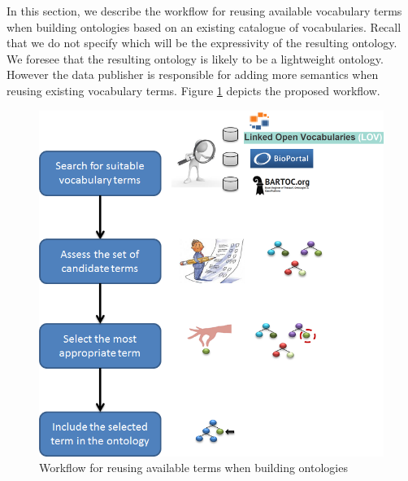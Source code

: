 
In this section, we describe the workflow for reusing available vocabulary terms when building ontologies based on an existing catalogue of vocabularies. Recall that we do not specify which will be the expressivity of the resulting ontology. We foresee that the resulting ontology is likely to be a lightweight ontology. However the data publisher is responsible for adding more semantics when reusing existing vocabulary terms. Figure \ref{fig:workflow} depicts the proposed workflow. 

\begin{figure}
\centering
\includegraphics[scale=0.5]{./img/process}
\caption{Workflow for reusing available terms when building ontologies}
\label{fig:workflow}
\end{figure}


